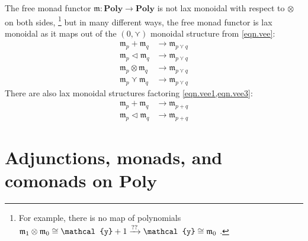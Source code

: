 \documentclass[11pt, one side, article]{memoir}
\theoremstyle{definition}
\theoremstyle{plain}
\newcommand{\Cat}[1]{\mathbf{#1}}%
\newcommand{\To}[2][]{\xrightarrow[#1]{\tn{$#2$}}}
\newcommand{\tn}[1]{\textnormal{#1}}
\newcommand{\yon}{{\mathcal{y}}}
\newcommand{\poly}{\Cat{Poly}}
\newcommand{\0}{\textsf{0}}
\newcommand{\1}{\tn{\textsf{1}}}
\newcommand{\tri}{\mathbin{\triangleleft}}
\newcommand{\free}{\mathfrak{m}}
\begin{document}
The free monad functor $\free\colon\poly\to\poly$ is not lax monoidal with respect to $\otimes$ on both sides,%
\footnote{For example, there is no map of polynomials 
$
  \free_1\otimes\free_0\cong\yon+1
  \To{??}
  \yon\cong\free_0\
$.
}
but in many different ways, the free monad functor is lax monoidal as it maps out of the $(0,\curlyvee)$ monoidal structure from \eqref{eqn.vee}:
\begin{align}
\label{eqn.vee1}
	\free_p+\free_q&\to\free_{p\curlyvee q}\\
\label{eqn.vee3}
	\free_p\tri\free_q&\to\free_{p\curlyvee q}\\
\label{eqn.vee2}
	\free_p\otimes\free_q&\to\free_{p\curlyvee q}\\
\label{eqn.vee4}
	\free_p\curlyvee\free_q&\to\free_{p\curlyvee q}
\end{align}
There are also lax monoidal structures factoring \cref{eqn.vee1,eqn.vee3}:
\begin{align}
	\free_p+\free_q&\to\free_{p+q}\\
	\free_p\tri\free_q&\to\free_{p+q}
\end{align}


\chapter{Adjunctions, monads, and comonads on $\poly$}\label{chap.adj_mon_com}
\end{document}
